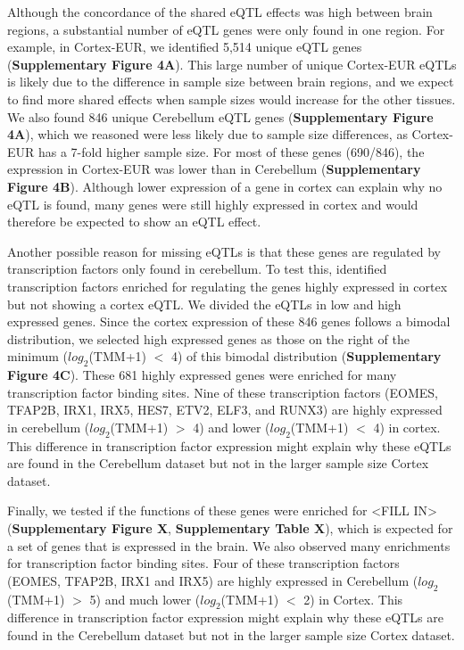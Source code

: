 Although the concordance of the shared eQTL effects was high between brain regions, a substantial number of eQTL genes were only found in one region. For example, in Cortex-EUR, we identified 5,514 unique eQTL genes (\textbf{Supplementary Figure 4A}). This large number of unique Cortex-EUR eQTLs is likely due to the difference in sample size between brain regions, and we expect to find more shared effects when sample sizes would increase for the other tissues. We also found 846 unique Cerebellum eQTL genes (\textbf{Supplementary Figure 4A}), which we reasoned were less likely due to sample size differences, as Cortex-EUR has a 7-fold higher sample size. For most of these genes (690/846), the expression in Cortex-EUR was lower than in Cerebellum (\textbf{Supplementary Figure 4B}). Although lower expression of a gene in cortex can explain why no eQTL is found, many genes were still highly expressed in cortex and would therefore be expected to show an eQTL effect.  

Another possible reason for missing eQTLs is that these genes are regulated by transcription factors only found in cerebellum. To test this, identified transcription factors enriched for regulating the genes highly expressed in cortex but not showing a cortex eQTL. We divided the eQTLs in low and high expressed genes. Since the cortex expression of these 846 genes follows a bimodal distribution, we selected high expressed genes as those on the right of the minimum ($log_2$(TMM+1) $<$ 4) of this bimodal distribution (\textbf{Supplementary Figure 4C}). These 681 highly expressed genes were enriched for many transcription factor binding sites. Nine of these transcription factors (EOMES, TFAP2B, IRX1, IRX5, HES7, ETV2, ELF3, and RUNX3) are highly expressed in cerebellum ($log_2$(TMM+1) $>$ 4) and lower ($log_2$(TMM+1) $<$ 4) in cortex. This difference in transcription factor expression might explain why these eQTLs are found in the Cerebellum dataset but not in the larger sample size Cortex dataset. 

Finally, we tested if the functions of these genes were enriched for <FILL IN> (\textbf{Supplementary Figure X}, \textbf{Supplementary Table X}), which is expected for a set of genes that is expressed in the brain. We also observed many enrichments for transcription factor binding sites. Four of these transcription factors (EOMES, TFAP2B, IRX1 and IRX5) are highly expressed in Cerebellum ($log_2$(TMM+1) $>$ 5) and much lower ($log_2$(TMM+1) $<$ 2) in Cortex. This difference in transcription factor expression might explain why these eQTLs are found in the Cerebellum dataset but not in the larger sample size Cortex dataset. 

